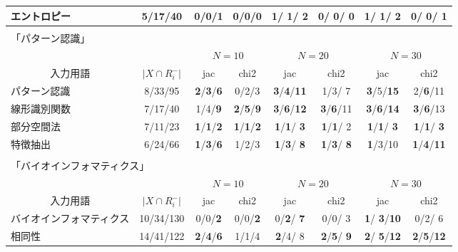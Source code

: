 \begin{table}
\begin{center}
\begin{tabular}{|l|c||cc|cc|cc|}
   エントロピー & 5/17/40 & 0/0/{\bf 1} & 0/0/0 & {\bf 1}/ {\bf 1}/ {\bf 2} & 0/ 0/ 0 & {\bf 1}/ {\bf 1}/ {\bf 2} & 0/ 0/ 1 \\ 
   \hline
   \multicolumn{8}{c}{\tiny }\\[-5pt]
   \multicolumn{8}{l}{「パターン認識」 }\\
   \hline
   \multicolumn{2}{|c||}{} &
   \multicolumn{2}{c}{$N=10$} & 
   \multicolumn{2}{|c}{$N=20$} &
   \multicolumn{2}{|c|}{$N=30$} \\
   \multicolumn{1}{|c}{入力用語} & 
   \multicolumn{1}{c||}{$|X\cap R_i^{-}|$} &
   \multicolumn{1}{c}{jac} &
   \multicolumn{1}{c}{chi2} &
   \multicolumn{1}{|c}{jac} &
   \multicolumn{1}{c}{chi2} &
   \multicolumn{1}{|c}{jac} &
   \multicolumn{1}{c|}{chi2} \\
   \hline
   パターン認識 & 8/33/95 & {\bf 2}/{\bf 3}/{\bf 6} & 0/2/3 & {\bf 3}/{\bf 4}/{\bf 11} & 1/3/ 7 & {\bf 3}/5/{\bf 15} & 2/{\bf 6}/11 \\ 
   線形識別関数 & 7/17/40 & 1/4/{\bf 9} & {\bf 2}/{\bf 5}/{\bf 9} & {\bf 3}/{\bf 6}/{\bf 12} & {\bf 3}/{\bf 6}/11 & {\bf 3}/{\bf 6}/{\bf 14} & {\bf 3}/{\bf 6}/13 \\ 
   部分空間法 & 7/11/23 & {\bf 1}/{\bf 1}/{\bf 2} & {\bf 1}/{\bf 1}/{\bf 2} & {\bf 1}/{\bf 1}/ {\bf 3} & {\bf 1}/{\bf 1}/ 2 & {\bf 1}/{\bf 1}/ {\bf 3} & {\bf 1}/{\bf 1}/ {\bf 3} \\ 
   特徴抽出 & 6/24/66 & {\bf 1}/{\bf 3}/{\bf 6} & 1/2/3 & {\bf 1}/{\bf 3}/ {\bf 8} & {\bf 1}/{\bf 3}/ {\bf 8} & {\bf 1}/3/10 & {\bf 1}/{\bf 4}/{\bf 11} \\ 
   \hline
   \multicolumn{8}{c}{\tiny }\\[-5pt]
   \multicolumn{8}{l}{「バイオインフォマティクス」 }\\
   \hline
   \multicolumn{2}{|c||}{} &
   \multicolumn{2}{c}{$N=10$} & 
   \multicolumn{2}{|c}{$N=20$} &
   \multicolumn{2}{|c|}{$N=30$} \\
   \multicolumn{1}{|c}{入力用語} & 
   \multicolumn{1}{c||}{$|X\cap R_i^{-}|$} &
   \multicolumn{1}{c}{jac} &
   \multicolumn{1}{c}{chi2} &
   \multicolumn{1}{|c}{jac} &
   \multicolumn{1}{c}{chi2} &
   \multicolumn{1}{|c}{jac} &
   \multicolumn{1}{c|}{chi2} \\
   \hline
   {\tiny バイオインフォマティクス} & 10/34/130 & 0/0/{\bf 2} & 0/0/{\bf 2} & 0/{\bf 2}/ {\bf 7} & 0/0/ 3 & {\bf 1}/ {\bf 3}/{\bf 10} & 0/2/ 6 \\ 
   相同性 & 14/41/122 & {\bf 2}/{\bf 4}/{\bf 6} & 1/1/4 & {\bf 2}/4/ 8 & {\bf 2}/{\bf 5}/ {\bf 9} & {\bf 2}/ {\bf 5}/{\bf 12} & {\bf 2}/{\bf 5}/{\bf 12} \\ 

\end{tabular}
\end{center}
\end{table}
